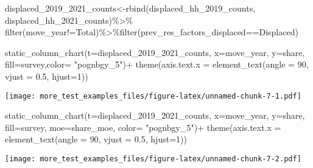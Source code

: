 \documentclass[
]{article}
\newenvironment{Shaded}{\begin{snugshade}}{\end{snugshade}}
\newcommand{\AttributeTok}[1]{\textcolor[rgb]{0.77,0.63,0.00}{#1}}
\newcommand{\DecValTok}[1]{\textcolor[rgb]{0.00,0.00,0.81}{#1}}
\newcommand{\FloatTok}[1]{\textcolor[rgb]{0.00,0.00,0.81}{#1}}
\newcommand{\FunctionTok}[1]{\textcolor[rgb]{0.00,0.00,0.00}{#1}}
\newcommand{\NormalTok}[1]{#1}
\newcommand{\OtherTok}[1]{\textcolor[rgb]{0.56,0.35,0.01}{#1}}
\newcommand{\SpecialCharTok}[1]{\textcolor[rgb]{0.00,0.00,0.00}{#1}}
\newcommand{\StringTok}[1]{\textcolor[rgb]{0.31,0.60,0.02}{#1}}
\begin{document}
\begin{Shaded}
\begin{Highlighting}[]
\NormalTok{displaced\_2019\_2021\_counts}\OtherTok{\textless{}{-}}\FunctionTok{rbind}\NormalTok{(displaced\_hh\_2019\_counts, displaced\_hh\_2021\_counts)}\SpecialCharTok{\%\textgreater{}\%}
\FunctionTok{filter}\NormalTok{(move\_year}\SpecialCharTok{!=}\StringTok{\textquotesingle{}Total\textquotesingle{}}\NormalTok{)}\SpecialCharTok{\%\textgreater{}\%}\FunctionTok{filter}\NormalTok{(prev\_res\_factors\_displaced}\SpecialCharTok{==}\StringTok{\textquotesingle{}Displaced\textquotesingle{}}\NormalTok{)}

\FunctionTok{static\_column\_chart}\NormalTok{(}\AttributeTok{t=}\NormalTok{displaced\_2019\_2021\_counts, }\AttributeTok{x=}\StringTok{\textquotesingle{}move\_year\textquotesingle{}}\NormalTok{, }\AttributeTok{y=}\StringTok{\textquotesingle{}share\textquotesingle{}}\NormalTok{, }\AttributeTok{fill=}\StringTok{\textquotesingle{}survey\textquotesingle{}}\NormalTok{,}\AttributeTok{color=}  \StringTok{"pognbgy\_5"}\NormalTok{)}\SpecialCharTok{+} \FunctionTok{theme}\NormalTok{(}\AttributeTok{axis.text.x =} \FunctionTok{element\_text}\NormalTok{(}\AttributeTok{angle =} \DecValTok{90}\NormalTok{, }\AttributeTok{vjust =} \FloatTok{0.5}\NormalTok{, }\AttributeTok{hjust=}\DecValTok{1}\NormalTok{))}
\end{Highlighting}
\end{Shaded}

\texttt{[image: more\_test\_examples\_files/figure-latex/unnamed-chunk-7-1.pdf]}

\begin{Shaded}
\begin{Highlighting}[]
\FunctionTok{static\_column\_chart}\NormalTok{(}\AttributeTok{t=}\NormalTok{displaced\_2019\_2021\_counts, }\AttributeTok{x=}\StringTok{\textquotesingle{}move\_year\textquotesingle{}}\NormalTok{, }\AttributeTok{y=}\StringTok{\textquotesingle{}share\textquotesingle{}}\NormalTok{, }\AttributeTok{fill=}\StringTok{\textquotesingle{}survey\textquotesingle{}}\NormalTok{, }\AttributeTok{moe=}\StringTok{\textquotesingle{}share\_moe\textquotesingle{}}\NormalTok{, }\AttributeTok{color=}  \StringTok{"pognbgy\_5"}\NormalTok{)}\SpecialCharTok{+} \FunctionTok{theme}\NormalTok{(}\AttributeTok{axis.text.x =} \FunctionTok{element\_text}\NormalTok{(}\AttributeTok{angle =} \DecValTok{90}\NormalTok{, }\AttributeTok{vjust =} \FloatTok{0.5}\NormalTok{, }\AttributeTok{hjust=}\DecValTok{1}\NormalTok{))}
\end{Highlighting}
\end{Shaded}

\texttt{[image: more\_test\_examples\_files/figure-latex/unnamed-chunk-7-2.pdf]}
\end{document}
